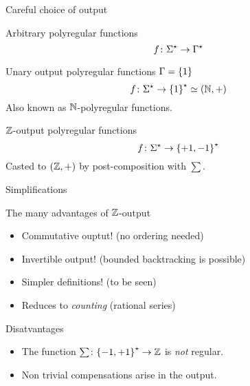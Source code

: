 \documentclass{beamer}
\begin{document}
\begin{frame}{Careful choice of output}
    \begin{block}{Arbitrary polyregular functions}
        \begin{equation*}
            f \colon \words \to \words[\Gamma]
        \end{equation*}
    \end{block}
    \pause
    \begin{block}{Unary output polyregular functions $\Gamma = \{ {1} \}$}
        \begin{equation*}
            f \colon \words \to \words[\set{1}] \simeq (\Nat,+)
        \end{equation*}
        Also known as $\mathbb{N}$-polyregular functions.
    \end{block}
    \pause
    \begin{block}{$\mathbb{Z}$-output polyregular functions}
        \begin{equation*}
            f \colon \words \to \words[\set{+1, -1}]
        \end{equation*}
        Casted to $(\mathbb{Z},+)$ by post-composition with $\sum$.
    \end{block}
\end{frame}

\begin{frame}{Simplifications}
    \begin{alertblock}{The many advantages of $\mathbb{Z}$-output}
        \begin{itemize}
            \item Commutative ouptut! (no ordering needed)
            \item Invertible output! (bounded backtracking is possible)
            \item Simpler definitions! (to be seen)
            \item Reduces to \emph{counting} (rational series)
        \end{itemize}
    \end{alertblock}
    \pause
    \begin{alertblock}{Disatvantages}
        \begin{itemize}
            \item The function $\sum \colon \words[\set{-1,+1}] \to \Rel$
                is \emph{not} regular.
            \item Non trivial compensations arise in the output.
        \end{itemize}
    \end{alertblock}
\end{frame}
\end{document}
